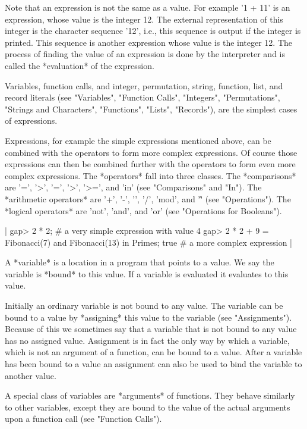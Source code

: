 Note that an expression is not the same as a value.  For example '1 + 11'
is  an    expression, whose value is   the   integer  12.    The external
representation of this integer is the character sequence '12', i.e., this
sequence is output  if the integer is  printed.  This sequence is another
expression whose value is  the integer 12.    The process of finding  the
value of an  expression  is done by  the  interpreter and is  called  the
*evaluation* of the expression.

Variables,  function  calls, and integer, permutation, string,  function,
list, and record literals (see "Variables", "Function Calls", "Integers",
"Permutations",   "Strings   and   Characters",   "Functions",   "Lists",
"Records"), are the simplest cases of expressions.

Expressions,  for example the simple expressions  mentioned above, can be
combined with the operators to form  more complex expressions.  Of course
those expressions can then be combined further with the operators to form
even more complex  expressions.  The *operators* fall into three classes.
The  *comparisons*  are  '=', '\<>',  '\<=', '>',   '>=',  and  'in' (see
"Comparisons" and "In").  The *arithmetic operators* are  '+', '-', '\*',
'/', 'mod', and '\^'   (see "Operations").   The *logical  operators* are
'not', 'and', and 'or' (see "Operations for Booleans").

|    gap> 2 * 2;    # a very simple expression with value
    4
    gap> 2 * 2 + 9 = Fibonacci(7) and  Fibonacci(13) in Primes;
    true            # a more complex expression |

%

A *variable*  is a location in a  {\GAP} program that  points to a value.
We say the variable is *bound* to this value.  If a variable is evaluated
it evaluates to this value.

Initially an ordinary variable is not  bound to  any value.  The variable
can be bound to a  value  by *assigning* this value to  the variable (see
"Assignments").  Because of this we sometimes say that a variable that is
not bound to any value has no assigned value.  Assignment  is in fact the
only way by which a variable, which is not an argument of a function, can
be bound to  a  value.  After a variable  has  been bound to a   value an
assignment can also be used to bind the variable to another value.

A special class of  variables are *arguments* of functions.  They  behave
similarly to other variables, except they are  bound to the  value of the
actual arguments upon a function call (see "Function Calls").

